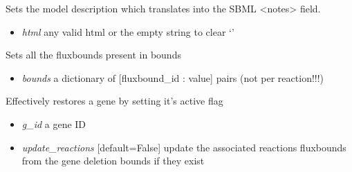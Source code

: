 \documentclass[a4paper,11pt,english]{sphinxmanual}
\begin{document}
\begin{fulllineitems}
\begin{fulllineitems}
\begin{itemize}
\end{itemize}

\end{fulllineitems}


\begin{fulllineitems}
\label{modules_doc:cbmpy.CBModel.Model.setDescription}
Sets the model description which translates into the SBML \textless{}notes\textgreater{} field.
\begin{itemize}
\item {} 
\emph{html} any valid html or the empty string to clear `'

\end{itemize}

\end{fulllineitems}


\begin{fulllineitems}
\label{modules_doc:cbmpy.CBModel.Model.setFluxBoundsFromDict}
Sets all the fluxbounds present in bounds
\begin{itemize}
\item {} 
\emph{bounds} a dictionary of {[}fluxbound\_id : value{]} pairs (not per reaction!!!)

\end{itemize}

\end{fulllineitems}


\begin{fulllineitems}
\label{modules_doc:cbmpy.CBModel.Model.setGeneActive}
Effectively restores a gene by setting it's active flag
\begin{itemize}
\item {} 
\emph{g\_id} a gene ID

\item {} 
\emph{update\_reactions} {[}default=False{]} update the associated reactions fluxbounds from the gene deletion bounds if they exist

\end{itemize}


\end{fulllineitems}
\end{fulllineitems}
\end{document}
